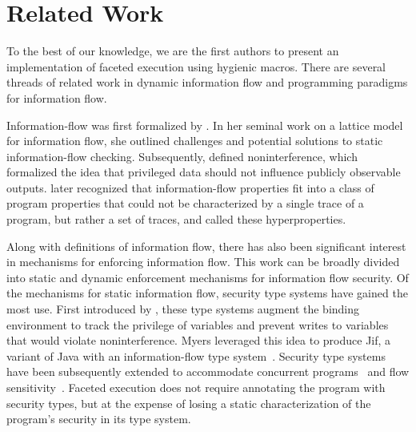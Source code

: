 \documentclass[review=true,acmlarge]{acmart}
\begin{document}
\section{Related Work}
\label{sec:related}

To the best of our knowledge, we are the first authors to present an
implementation of faceted execution using hygienic macros. There are
several threads of related work in dynamic information flow and
programming paradigms for information flow.

Information-flow was first formalized by \citet{Denning:1976}.
In her seminal work on a lattice model
for information flow, she outlined challenges and potential solutions
to static information-flow checking. Subsequently, \citet{Goguen:82}
defined noninterference, which formalized the idea that privileged
data should not influence publicly observable
outputs. \citet{Clarkson:08} later recognized that
information-flow properties fit into a class of program properties
that could not be characterized by a single trace of a program, but
rather a set of traces, and called these hyperproperties.

Along with definitions of information flow, there has also been
significant interest in mechanisms for enforcing information
flow. This work can be broadly divided into static and dynamic
enforcement mechanisms for information flow security. Of the
mechanisms for static information flow, security type systems have
gained the most use. First introduced by \citet{Volpano:1997}, these
type systems augment the binding environment to track the privilege of
variables and prevent writes to variables that would violate
noninterference. Myers leveraged this idea to produce Jif, a variant
of Java with an information-flow type
system~\cite{Myers:1999}. Security type systems have been subsequently
extended to accommodate concurrent programs~\cite{Zdancewic:03} and
flow sensitivity~\cite{Hunt:2006}. Faceted execution does not require
annotating the program with security types, but at the expense of
losing a static characterization of the program's security in its type
system.
\end{document}
